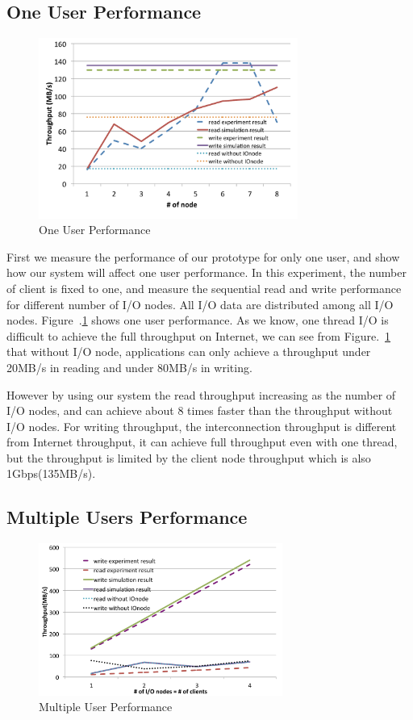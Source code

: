 \subsection{One User Performance}

\begin{figure}
\centering
\includegraphics[width=8.5cm]{img/one_client.pdf}
\caption{One User Performance}
\label{evaluation:one user performance}
\end{figure}

First we measure the performance of our prototype for only one user, and show how our system
will affect one user performance.
In this experiment, the number of client is fixed to one, and measure
the sequential read and write performance for different number of I/O nodes.
All I/O data are distributed among all I/O nodes.
Figure~.\ref{evaluation:one user performance} shows one user performance.
As we know, one thread I/O is difficult to achieve the full throughput on Internet, we can see from
Figure.~\ref{evaluation:one user performance} that without I/O node, applications can only achieve a
throughput under 20MB/s in reading and under 80MB/s in writing.

However by using our system the read throughput increasing as the number of I/O nodes, and can
achieve about 8 times faster than the throughput without I/O nodes.
For writing throughput, the interconnection throughput is different from Internet throughput, it can
achieve full throughput even with one thread, but the throughput is limited by the client node
throughput which is also 1Gbps(135MB/s).

\subsection{Multiple Users Performance}

\begin{figure}
\centering
\includegraphics[width=8cm]{img/multiple_client.pdf}
\caption{Multiple User Performance}
\label{evaluation:multiple user performance}
\end{figure}

